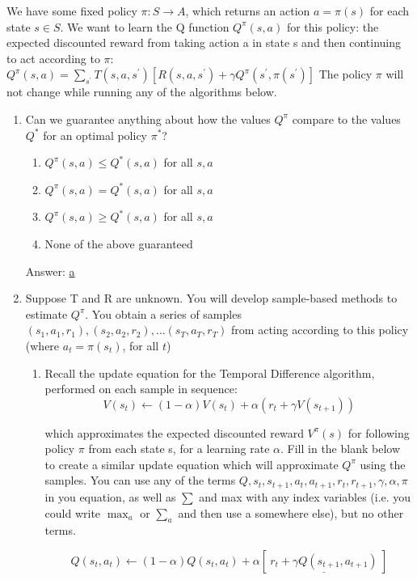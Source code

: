 \documentclass[11pt, answers]{exam}
\begin{document}
We have some fixed policy $\pi: S \rightarrow A$, which returns an action $a=\pi(s)$ for each state $s \in S$. We want to learn the Q function $Q^{\pi}(s, a)$ for this policy: the expected discounted reward from taking action a in state s and then
continuing to act according to $\pi$: $Q^{\pi}(s, a)=\sum_{s^{\prime}} T\left(s, a, s^{\prime}\right)\left[R\left(s, a, s^{\prime}\right)+\gamma Q^{\pi}\left(s^{\prime}, \pi\left(s^{\prime}\right)\right]\right.$ The policy $\pi$ will not change
while running any of the algorithms below.
\begin{enumerate}
\item Can we guarantee anything about how the values $Q^{\pi}$ compare to the values $Q^{*}$ for an optimal policy $\pi^{*}$?
\begin{enumerate}
\item $Q^{\pi}(s, a) \leq Q^{*}(s, a)$ for all $s,a$
\item $Q^{\pi}(s, a) = Q^{*}(s, a)$ for all $s,a$
\item $Q^{\pi}(s, a) \geq Q^{*}(s, a)$ for all $s,a$
\item None of the above guaranteed
\end{enumerate}
Answer: \underline{ a }

\item Suppose T and R are unknown. You will develop sample-based methods to estimate $Q^{\pi}$. You obtain a series of samples $\left(s_{1}, a_{1}, r_{1}\right),\left(s_{2}, a_{2}, r_{2}\right), \ldots\left(s_{T}, a_{T}, r_{T}\right)$ from acting according to this policy (where $a_t = \pi(s_t)$, for all $t$)
\begin{enumerate}
\item Recall the update equation for the Temporal Difference algorithm, performed on each sample in sequence:
$$V\left(s_{t}\right) \leftarrow(1-\alpha) V\left(s_{t}\right)+\alpha\left(r_{t}+\gamma V\left(s_{t+1}\right)\right)$$

which approximates the expected discounted reward $V^{\pi}(s)$ for following policy $\pi$ from each state s, for a learning rate $\alpha$.
Fill in the blank below to create a similar update equation which will approximate $Q^{\pi}$  using the samples.
You can use any of the terms $Q, s_{t}, s_{t+1}, a_{t}, a_{t+1}, r_{t}, r_{t+1}, \gamma, \alpha, \pi$ in you equation, as well as $\sum$ and max
with any index variables (i.e. you could write $\max _{a}$ or $\sum_{a}$ and then use a somewhere else), but no other terms.

$$Q\left(s_{t}, a_{t}\right) \leftarrow(1-\alpha) Q\left(s_{t}, a_{t}\right)+\alpha[\underline{\ r_{t}+\gamma Q(s_{t+1}, a_{t+1}) \ }]$$


\end{enumerate}
\end{enumerate}
\end{document}
